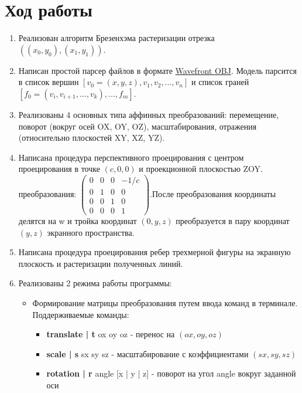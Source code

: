 \documentclass[a4paper,12pt]{article}
\begin{document}
\section{\normalsize{Ход работы}}
\begin{flushleft}
  \begin{enumerate}
    \item Реализован алгоритм Брезенхэма растеризации отрезка \(((x_0, y_0),(x_1,y_1))\).
    \item Написан простой парсер файлов в формате \href{https://ru.wikipedia.org/wiki/Obj}{Wavefront OBJ}. Модель парсится в список вершин \([v_0 = (x, y, z), v_1, v_2, ..., v_n]\) и список граней \([f_0 = (v_i, v_{i+1}, ..., v_k), ..., f_m]\).
    \item Реализованы 4 основных типа аффинных преобразований: перемещение, поворот (вокруг осей OX, OY, OZ), масштабирования, отражения (относительно плоскостей XY, XZ, YZ).
    \item Написана процедура перспективного проецирования с центром проецирования в точке \((c, 0, 0)\) и проекционной плоскостью ZOY.  преобразования: \(\begin{pmatrix}0 & 0 & 0 & - 1/c \\ 0 & 1 & 0 & 0 \\ 0 & 0 & 1 & 0 \\ 0 & 0 & 0 & 1\end{pmatrix}\).\linebreak После преобразования координаты делятся на w и тройка координат \((0, y, z)\) преобразуется в пару координат \((y, z)\) экранного пространства. 
    \item Написана процедура проецирования ребер трехмерной фигуры на экранную плоскость и растеризации полученных линий.
    \item Реализованы 2 режима работы программы:
      \linebreak
      \begin{itemize}
        \item Формирование матрицы преобразования путем ввода команд в терминале. Поддерживаемые команды:
          \linebreak
          \begin{itemize}
            \item \textbf{translate | t} ox oy oz - перенос на \((ox, oy, oz)\)
            \item \textbf{scale | s} sx sy sz - масштабирование с коэффициентами \((sx, sy, sz)\)
            \item \textbf{rotation | r} angle [x | y | z] - поворот на угол angle вокруг заданной оси

\end{itemize}
\end{itemize}
\end{enumerate}
\end{flushleft}
\end{document}
